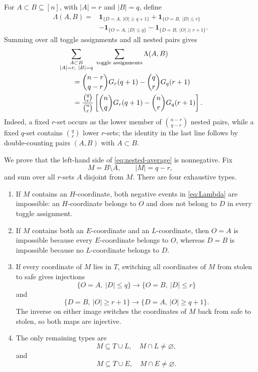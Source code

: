 \documentclass[11pt]{article}
\newcommand{\1}{\mathbf 1}
\begin{document}
For $A\subset B\subseteq[n]$, with $|A|=r$ and $|B|=q$, define
\begin{equation}\label{eq:Lambda}
\begin{aligned}
\Lambda(A,B)={}&
\1_{\{D=A,\ |O|\geq q+1\}}
+\1_{\{O=B,\ |D|\leq r\}}\\
&-\1_{\{O=A,\ |D|\leq q\}}
-\1_{\{D=B,\ |O|\geq r+1\}}.
\end{aligned}
\end{equation}
Summing over all toggle assignments and all nested pairs gives
\begin{align}
&\sum_{\substack{A\subset B\\|A|=r,\ |B|=q}}
\ \sum_{\text{toggle assignments}}\Lambda(A,B)
\notag\\
&\qquad
=\binom{n-r}{q-r}G_r(q+1)
-\binom qrG_q(r+1)\notag\\
&\qquad
=\frac{\binom qr}{\binom nr}
\left[
\binom nqG_r(q+1)-\binom nrG_q(r+1)
\right].
\label{eq:nested-average}
\end{align}
Indeed, a fixed $r$-set occurs as the lower member of
$\binom{n-r}{q-r}$ nested pairs, while a fixed $q$-set contains
$\binom qr$ lower $r$-sets; the identity in the last line follows by
double-counting pairs $(A,B)$ with $A\subset B$.

We prove that the left-hand side of \eqref{eq:nested-average} is
nonnegative.  Fix
\[
M=B\setminus A,
\qquad
|M|=q-r,
\]
and sum over all $r$-sets $A$ disjoint from $M$.  There are four
exhaustive types.

\begin{enumerate}
\item If $M$ contains an $H$-coordinate, both negative events in
\eqref{eq:Lambda} are impossible: an $H$-coordinate belongs to $O$ and
does not belong to $D$ in every toggle assignment.

\item If $M$ contains both an $E$-coordinate and an $L$-coordinate,
then $O=A$ is impossible because every $E$-coordinate belongs to $O$,
whereas $D=B$ is impossible because no $L$-coordinate belongs to $D$.

\item If every coordinate of $M$ lies in $T$, switching all
coordinates of $M$ from stolen to safe gives injections
\[
\{O=A,\ |D|\leq q\}
\longrightarrow
\{O=B,\ |D|\leq r\}
\]
and
\[
\{D=B,\ |O|\geq r+1\}
\longrightarrow
\{D=A,\ |O|\geq q+1\}.
\]
The inverse on either image switches the coordinates of $M$ back from
safe to stolen, so both maps are injective.

\item The only remaining types are
\[
M\subseteq T\cup L,\quad M\cap L\neq\varnothing,
\]
and
\[
M\subseteq T\cup E,\quad M\cap E\neq\varnothing.
\]
\end{enumerate}
\end{document}
